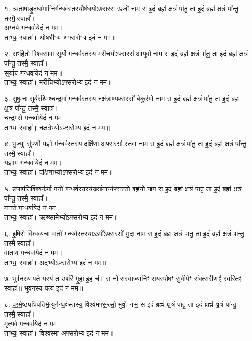 १. ऋ॒ता॒षाडृ॒तधा॑मा॒ग्निर्ग॑न्ध॒र्वस्तस्यौष॑धयोऽफ्स॒रस॒ ऊर्जो॒ नाम॒
स इ॒दं ब्रह्म॑ क्ष॒त्रं पा॑तु॒ ता इ॒दं ब्रह्म॑ क्ष॒त्रं पा᳚न्तु॒ तस्मै॒ स्वाहा᳚। \\
अग्नये गन्धर्वायेदं न मम।\\
ताभ्यः॒ स्वाहा᳚। ओषधीभ्य अफ्सरोभ्य इदं न मम॥

२. स॒ꣳ॒हि॒तो वि॒श्वसा॑मा॒ सूर्यो॑ गन्ध॒र्वस्तस्य॒ मरी॑चयोऽफ्स॒रस॑ आ॒युवो॒ नाम॒ स इ॒दं ब्रह्म॑ क्ष॒त्रं पा॑तु॒ ता इ॒दं ब्रह्म॑ क्ष॒त्रं पा᳚न्तु॒ तस्मै॒ स्वाहा᳚।\\
सूर्याय गन्धर्वायेदं न मम॥\\
ताभ्यः॒ स्वाहा᳚। मरीचिभ्योऽफ्सरोभ्य इदं न मम॥

३. सु॒षु॒म्नः सूर्य॑रश्मिश्च॒न्द्रमा॑ गन्ध॒र्वस्तस्य॒ नक्ष॑त्राण्यफ्स॒रसो॑ बे॒कुर॑यो॒ नाम॒ स इ॒दं ब्रह्म॑ क्ष॒त्रं पा॑तु॒ ता इ॒दं ब्रह्म॑ क्ष॒त्रं पा᳚न्तु॒ तस्मै॒ स्वाहा᳚।\\
चन्द्रमसे गन्धर्वायेदं न मम।\\
ताभ्यः॒ स्वाहा᳚। नक्षत्रेभ्योऽफ्सरोभ्य इदं न मम॥

४. भु॒ज्युः सु॑प॒र्णो य॒ज्ञो ग॑न्ध॒र्वस्तस्य॒ दक्षि॑णा अफ्स॒रसः॑ स्त॒वा नाम॒ स इ॒दं ब्रह्म॑ क्ष॒त्रं पा॑तु॒ ता इ॒दं ब्रह्म॑ क्ष॒त्रं पा᳚न्तु॒ तस्मै॒ स्वाहा᳚।\\
यज्ञाय गन्धर्वायेदं न मम।\\
ताभ्यः॒ स्वाहा᳚। दक्षिणाभ्योऽफ्सरोभ्य इदं न मम॥

५. प्र॒जाप॑तिर्वि॒श्वक॑र्मा॒ मनो॑ गन्ध॒र्वस्तस्य॑र्ख्सा॒मान्य॑फ्स॒रसो॒ वह्न॑यो॒ नाम॒ स इ॒दं ब्रह्म॑ क्ष॒त्रं पा॑तु॒ ता इ॒दं ब्रह्म॑ क्ष॒त्रं पा᳚न्तु॒ तस्मै॒ स्वाहा᳚।\\
मनसे गन्धर्वायेदं न मम।\\
ताभ्यः॒ स्वाहा᳚। ऋख्सामेभ्योऽफ्सरोभ्य इदं न मम॥

६. इ॒षि॒रो वि॒श्वव्य॑चा॒ वातो॑ गन्ध॒र्वस्तस्याऽऽपो᳚ऽफ्स॒रसो॑ मु॒दा नाम॒ स इ॒दं ब्रह्म॑ क्ष॒त्रं पा॑तु॒ ता इ॒दं ब्रह्म॑ क्ष॒त्रं पा᳚न्तु॒ तस्मै॒ स्वाहा᳚।\\
वाताय गन्धर्वायेदं न मम।\\
ताभ्यः॒ स्वाहा᳚। अद्भ्योऽफ्सरोभ्य इदं न मम॥

७. भुव॑नस्य पते॒ यस्य॑ त उ॒परि॑ गृ॒हा इ॒ह च॑।
स नो॑ रा॒स्वाज्या॑निꣳ रा॒यस्पोषꣳ॑ सु॒वीर्यꣳ॑ संवत्स॒रीणाꣴ॑ स्व॒स्तिꣴ स्वाहा᳚॥ भुवनस्य पत्य इदं न मम॥

८. प॒र॒मे॒ष्ठ्यधि॑पतिर्मृ॒त्युर्ग॑न्ध॒र्वस्तस्य॒ विश्व॑मफ्स॒रसो॒ भुवो॒ नाम॒ स इ॒दं ब्रह्म॑ क्ष॒त्रं पा॑तु॒ ता इ॒दं ब्रह्म॑ क्ष॒त्रं पा᳚न्तु॒ तस्मै॒ स्वाहा᳚।\\
मृत्यवे गन्धर्वायेदं न मम।\\
ताभ्यः॒ स्वाहा᳚। विश्वस्मा अफ्सरोभ्य इदं न मम॥

